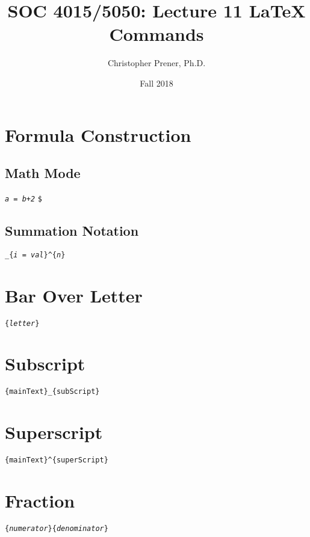 \documentclass{tufte-handout}
\title{SOC 4015/5050: Lecture 11 LaTeX Commands}
\author{Christopher Prener, Ph.D.}
\date{Fall 2018}
\begin{document}
\maketitle %

\vspace{5mm}
\section{Formula Construction}
\subsection{Math Mode}
\noindent {\color{red}\texttt{\$}} \texttt{\textit{a = b+2}} {\color{red}\texttt{\$}}

\vspace{3mm}
\subsection{Summation Notation}
\texttt{\_\{\textit{i} = \textit{val}\}\textasciicircum\{\textit{n}\}}

\vspace{3mm}
\section{Bar Over Letter}
\texttt{\{\textit{letter}\}}

\vspace{3mm}
\section{Subscript}
\noindent \texttt{\{mainText\}\_\{subScript\}}

\vspace{3mm}
\section{Superscript}
\noindent \texttt{\{mainText\}\textasciicircum\{superScript\}}

\vspace{3mm}
\section{Fraction}
\texttt{\{\textit{numerator}\}}\texttt{\{\textit{denominator}\}}
\end{document}

